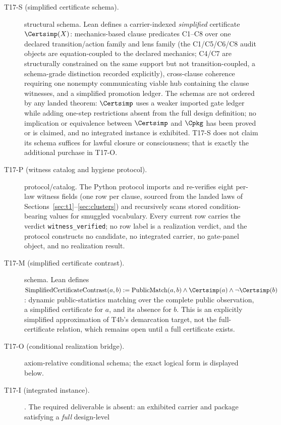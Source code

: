 \begin{description}
\item[T17-S (simplified certificate schema).] \gradeS{} structural schema.
Lean defines a carrier-indexed \emph{simplified} certificate
$\Certsimp(X)$: mechanics-based clause predicates C1--C8 over one declared
transition/action family and lens family (the C1/C5/C6/C8 audit objects are
equation-coupled to the declared mechanics; C4/C7 are structurally
constrained on the same support but not transition-coupled, a schema-grade
distinction recorded explicitly), cross-clause coherence requiring one
nonempty communicating viable hub containing the clause witnesses, and a
simplified promotion ledger. The schemas are not ordered by any landed
theorem: $\Certsimp$ uses a weaker imported gate ledger while adding one-step
restrictions absent from the full design definition; no implication or
equivalence between $\Certsimp$ and $\Cpkg$ has been proved or is claimed,
and no integrated instance is exhibited. T17-S does not claim its schema
suffices for lawful closure or consciousness; that is exactly the
additional purchase in T17-O.
\item[T17-P (witness catalog and hygiene protocol).] \gradeS{}
protocol/catalog. The Python protocol imports and re-verifies eight per-law
witness fields (one row per clause, sourced from the landed laws of
Sections~\ref{sec:t1}--\ref{sec:clusters}) and recursively scans stored
condition-bearing values for smuggled vocabulary. Every current row carries
the verdict \texttt{witness\_verified}; no row label is a realization
verdict, and the protocol constructs no candidate, no integrated carrier, no
gate-panel object, and no realization result.
\item[T17-M (simplified certificate contrast).] \gradeS{} schema. Lean
defines $\mathrm{SimplifiedCertificateContrast}(a,b) :=
\mathrm{PublicMatch}(a,b) \wedge \Certsimp(a) \wedge \neg\Certsimp(b)$:
dynamic public-statistics matching over the complete public observation, a
simplified certificate for $a$, and its absence for $b$. This is an
explicitly simplified approximation of T4b's demarcation target, not the
full-certificate relation, which remains open until a full certificate
exists.
\item[T17-O (conditional realization bridge).] \gradeO{} axiom-relative
conditional schema; the exact logical form is displayed below.
\item[T17-I (integrated instance).] \gradeOpen. The required deliverable is
absent: an exhibited carrier and package satisfying a \emph{full} design-level

\end{description}
